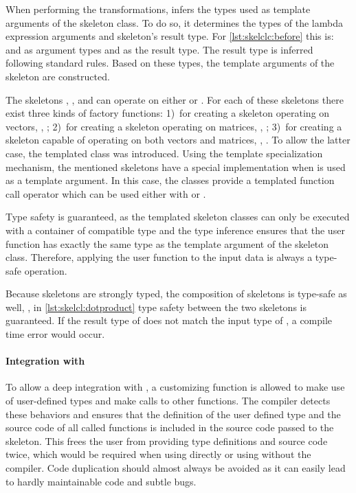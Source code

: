 When performing the transformations,  infers the types used as template arguments of the skeleton class.
To do so, it determines the types of the lambda expression arguments and skeleton's result type.
For \autoref{lst:skelclc:before} this is:  and  as argument types and  as the result type.
The result type is inferred following standard \Cpp rules.
Based on these types, the template arguments of the skeleton are constructed.

The skeletons \map, \zip, and \stencil can operate on either  or .
For each of these skeletons there exist three kinds of factory functions:
1)~for creating a skeleton operating on vectors, \eg, ;
2)~for creating a skeleton operating on matrices, \eg, ;
3)~for creating a skeleton capable of operating on both vectors and matrices, \eg, .
To allow the latter case, the templated class  was introduced.
Using the template specialization mechanism, the mentioned skeletons have a special implementation when  is used as a template argument.
In this case, the classes provide a templated function call operator which can be used either with  or .

Type safety is guaranteed, as the templated skeleton classes can only be executed with a container of compatible type and the type inference ensures that the user function has exactly the same type as the template argument of the skeleton class.
Therefore, applying the user function to the input data is always a type-safe operation.

Because skeletons are strongly typed, the composition of skeletons is type-safe as well, \ie, in \autoref{lst:skelcl:dotproduct} type safety between the two skeletons is guaranteed.
If the result type of  does not match the input type of , a compile time error would occur.

\paragraph{Integration with \Cpp}
To allow a deep integration with \Cpp, a customizing function is allowed to make use of user-defined types and make calls to other functions.
The  compiler detects these behaviors and ensures that the definition of the user defined type and the source code of all called functions is included in the source code passed to the skeleton.
This frees the user from providing type definitions and source code twice, which would be required when using \OpenCL directly or using \SkelCL without the  compiler.
Code duplication should almost always be avoided as it can easily lead to hardly maintainable code and subtle bugs.

